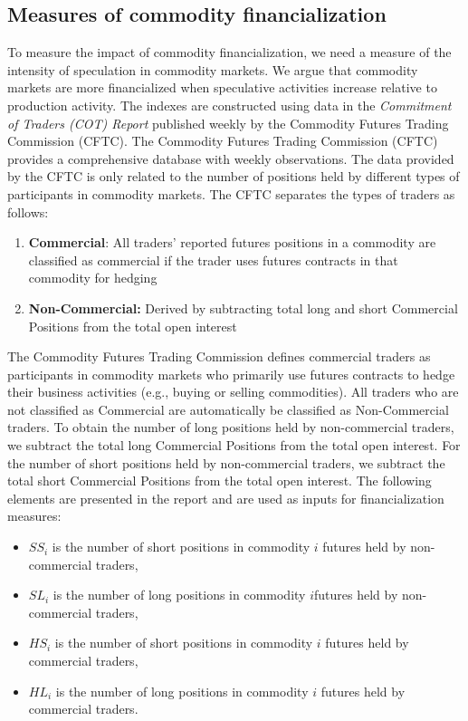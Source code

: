 \documentclass[12pt]{article}
\begin{document}
\subsection{Measures of commodity financialization}
To measure the impact of commodity financialization, we need a measure of the intensity of speculation in commodity markets. We argue that commodity markets are more financialized when speculative activities increase relative to production activity. The indexes are constructed using data in the \emph{Commitment of Traders (COT) Report} published weekly by the Commodity Futures Trading Commission (CFTC). The Commodity Futures Trading Commission (CFTC) provides a comprehensive database with weekly observations. The data provided by the CFTC is only related to the number of positions held by different types of participants in commodity markets. The CFTC separates the types of traders as follows:

\begin{enumerate}
\item \textbf{Commercial}: All traders' reported futures positions in a commodity are classified as commercial if the trader uses futures contracts in that commodity for hedging
\item \textbf{Non-Commercial:} Derived by subtracting total long and short Commercial Positions from the total open interest
\end{enumerate}

The Commodity Futures Trading Commission defines commercial traders as participants in commodity markets who primarily use futures contracts to hedge their business activities (e.g., buying or selling commodities). All traders who are not classified as Commercial are automatically be classified as Non-Commercial traders. To obtain the number of long positions held by non-commercial traders, we subtract the total long Commercial Positions from the total open interest. For the number of short positions held by non-commercial traders, we subtract the total short Commercial Positions from the total open interest. The following elements are presented in the report and are used as inputs for financialization measures:

\begin{itemize}
\item $SS_i$ is the number of short positions in commodity $i$ futures held by non-commercial traders,
\item $SL_i$  is the number of long positions in commodity $i$futures held by non-commercial traders,
\item $HS_i$ is the number of short positions in commodity $i$ futures held by commercial traders, 
\item $HL_i$ is the number of long positions in commodity $i$ futures held by commercial traders.
\end{itemize}
\end{document}
